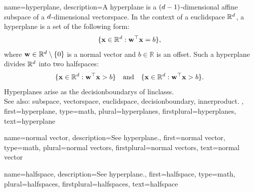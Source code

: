 {name={hyperplane},
	description={A hyperplane is a $(d-1)$-dimensional affine 
		\gls{subspace} of a $d$-dimensional \gls{vectorspace}. In the 
		context of a \gls{euclidspace} $\mathbb{R}^{d}$, a 
		hyperplane is a set of the following form:
 		\[ 
		\{ {\bf x} \in \mathbb{R}^d : {\bf w}^\top {\bf x} = b \},
  		\]
		where ${\bf w} \in \mathbb{R}^d \setminus \{0\}$ is a normal \gls{vector} 
		and $b \in \mathbb{R}$ is an offset. Such a hyperplane divides
		$\mathbb{R}^d$ into two \glspl{halfspace}:
		\[\{ {\bf x} \in \mathbb{R}^d : {\bf w}^\top {\bf x} > b \}  \quad
		\text{and}  \quad  \{ {\bf x} \in \mathbb{R}^d : {\bf w}^\top {\bf x} > b \}.\]
 		Hyperplanes arise as the \glspl{decisionboundary} of \glspl{linclass}.
		\\
		See also: \gls{subspace}, \gls{vectorspace}, \gls{euclidspace}, \gls{decisionboundary}, \gls{innerproduct}. },
	first={hyperplane},
	type=math,
	plural={hyperplanes}, 
	firstplural={hyperplanes},
	text={hyperplane}
}

{name={normal vector},
	description={See \gls{hyperplane}.},
	first={normal vector},
	type=math,
	plural={normal vectors}, 
	firstplural={normal vectors},
	text={normal vector}
}

{name={halfspace},
	description={See \gls{hyperplane}.},
	first={halfspace},
	type=math,
	plural={halfspaces}, 
	firstplural={halfspaces},
	text={halfspace}
}

